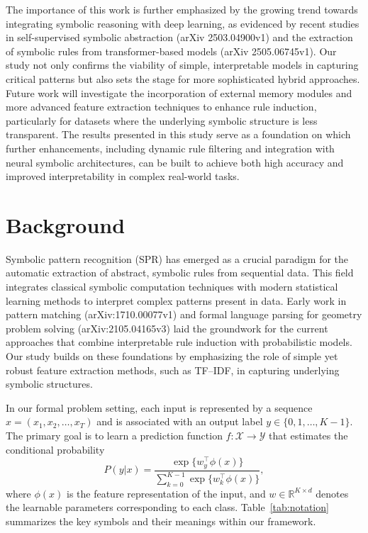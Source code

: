 \documentclass{article}
\begin{document}
The importance of this work is further emphasized by the growing trend towards integrating symbolic reasoning with deep learning, as evidenced by recent studies in self-supervised symbolic abstraction (arXiv 2503.04900v1) and the extraction of symbolic rules from transformer-based models (arXiv 2505.06745v1). Our study not only confirms the viability of simple, interpretable models in capturing critical patterns but also sets the stage for more sophisticated hybrid approaches. Future work will investigate the incorporation of external memory modules and more advanced feature extraction techniques to enhance rule induction, particularly for datasets where the underlying symbolic structure is less transparent. The results presented in this study serve as a foundation on which further enhancements, including dynamic rule filtering and integration with neural symbolic architectures, can be built to achieve both high accuracy and improved interpretability in complex real-world tasks.

\section{Background}
Symbolic pattern recognition (SPR) has emerged as a crucial paradigm for the automatic extraction of abstract, symbolic rules from sequential data. This field integrates classical symbolic computation techniques with modern statistical learning methods to interpret complex patterns present in data. Early work in pattern matching (arXiv:1710.00077v1) and formal language parsing for geometry problem solving (arXiv:2105.04165v3) laid the groundwork for the current approaches that combine interpretable rule induction with probabilistic models. Our study builds on these foundations by emphasizing the role of simple yet robust feature extraction methods, such as TF–IDF, in capturing underlying symbolic structures.

In our formal problem setting, each input is represented by a sequence \( x = (x_1, x_2, \dots, x_T) \) and is associated with an output label \( y \in \{0, 1, \dots, K-1\} \). The primary goal is to learn a prediction function \( f:\mathcal{X} \to \mathcal{Y} \) that estimates the conditional probability
\[
P(y|x) = \frac{\exp\{w_y^\top \phi(x)\}}{\sum_{k=0}^{K-1} \exp\{w_k^\top \phi(x)\}},
\]
where \( \phi(x) \) is the feature representation of the input, and \( w \in \mathbb{R}^{K \times d} \) denotes the learnable parameters corresponding to each class. Table~\ref{tab:notation} summarizes the key symbols and their meanings within our framework.
\end{document}
